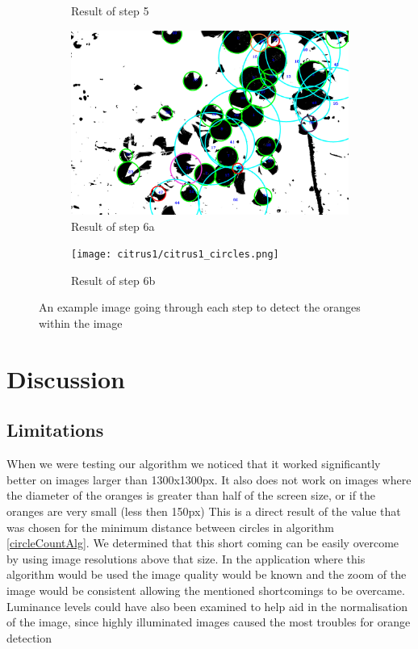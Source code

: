 \documentclass[conference]{IEEEtran}
\begin{document}
\begin{figure}[H]
\begin{subfigure}{.3\linewidth}
  	\caption{Result of step 5}
  \end{subfigure}\par\medskip
  \begin{subfigure}{.49\linewidth}
  	\includegraphics[width=\linewidth]{citrus1/citrus1_circles_mask.png}\hfill
	   	\caption{Result of step 6a}
  \end{subfigure}
  \begin{subfigure}{.49\linewidth}
  	\texttt{[image: citrus1/citrus1\_circles.png]}\hfill
 	 \caption{Result of step 6b}
  \end{subfigure}
  \caption{An example image going through each step to detect the oranges within the image} \label{fig:stages}
\end{figure}


\section{Discussion}

\subsection{Limitations} \label{sec:limitations}

When we were testing our algorithm we noticed that it worked significantly better on images larger than 1300x1300px. It also does not work on images where the diameter of the oranges is greater than half of the screen size, or if the oranges are very small (less then 150px) This is a direct result of the value that was chosen for the minimum distance between circles in algorithm \ref{circleCountAlg}. We determined that this short coming can be easily overcome by using image resolutions above that size. In the application where this algorithm would be used the image quality would be known and the zoom of the image would be consistent allowing the mentioned shortcomings to be overcame.  Luminance levels could have also been examined to help aid in the normalisation of the image, since highly illuminated images caused the most troubles for orange detection
\end{document}
